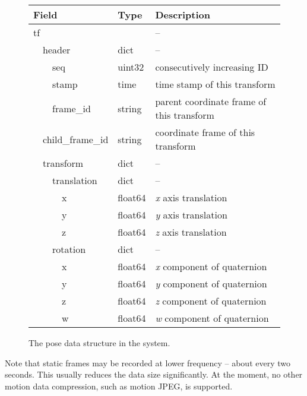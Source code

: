 \def\arraystretch{1.1}%
\begin{figure}[htb]
\begin{center}\begin{tabular}{ >{\ttfamily}p{3.5cm} >{\ttfamily}p{2cm} p{5cm} }
\toprule
\bf Field   & \bf Type & \bf Description \\ \midrule
tf			& [dict]	& -- \\
\ \ header		& dict		& -- \\
\ \ \ \ seq		& uint32	& consecutively increasing ID \\
\ \ \ \ stamp		& time		& time stamp of this transform \\
\ \ \ \ frame\_id	& string	& parent coordinate frame of this transform \\
\ \ child\_frame\_id	& string	& coordinate frame of this transform \\
\ \ transform		& dict		& -- \\
\ \ \ \ translation	& dict		& -- \\
\ \ \ \ \ \ x		& float64	& \emph{x} axis translation \\
\ \ \ \ \ \ y		& float64	& \emph{y} axis translation \\
\ \ \ \ \ \ z		& float64	& \emph{z} axis translation \\
\ \ \ \ rotation	& dict		& -- \\
\ \ \ \ \ \ x		& float64	& \emph{x} component of quaternion \\
\ \ \ \ \ \ y		& float64	& \emph{y} component of quaternion \\
\ \ \ \ \ \ z		& float64	& \emph{z} component of quaternion \\
\ \ \ \ \ \ w		& float64	& \emph{w} component of quaternion \\
\bottomrule
\end{tabular}\end{center}
\caption{The pose data structure in the \ease system.}
\label{fig:pose_data}
\end{figure}

Note that static frames may be recorded at lower frequency --
about every two seconds.
This usually reduces the data size significantly.
At the moment, no other motion data compression,
such as motion JPEG, is supported.


